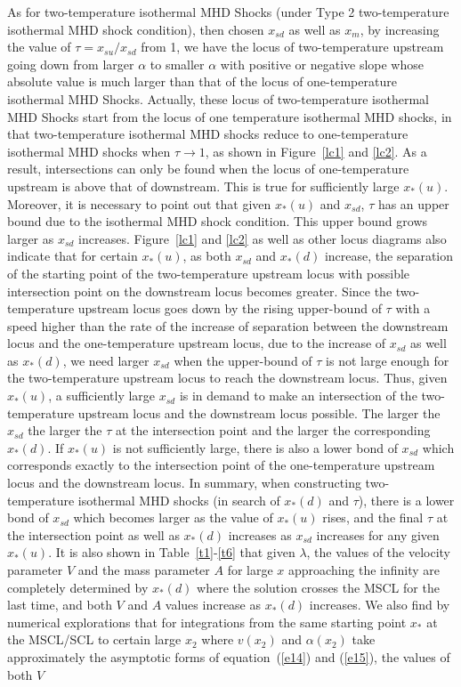 \documentclass[fleqn,usenatbib]{mnras}
\begin{document}
As for two-temperature isothermal MHD Shocks (under Type 2 two-temperature isothermal MHD shock condition), then chosen $x_{sd}$ as well as $x_{m}$, by increasing the value of $\tau=x_{su}/x_{sd}$ from 1, we have the locus of two-temperature upstream going down from larger $\alpha$ to smaller $\alpha$ with positive or negative slope whose absolute value is much larger than that of the locus of one-temperature isothermal MHD Shocks. Actually, these locus of two-temperature isothermal MHD Shocks start from the locus of one temperature isothermal MHD shocks, in that two-temperature isothermal MHD shocks reduce to one-temperature isothermal MHD shocks when $\tau\rightarrow 1$, as shown in Figure~\ref{lc1} and \ref{lc2}. As a result, intersections can only be found when the locus of one-temperature upstream is above that of downstream. This is true for sufficiently large $x_{*}(u)$. Moreover, it is necessary to point out that given $x_{*}(u)$ and $x_{sd}$, $\tau$ has an upper bound due to the isothermal MHD shock condition. This upper bound grows larger as $x_{sd}$ increases. Figure~\ref{lc1} and \ref{lc2} as well as other locus diagrams also indicate that for certain $x_{*}(u)$, as both $x_{sd}$ and $x_{*}(d)$ increase, the separation of the starting point of the two-temperature upstream locus with possible intersection point on the downstream locus becomes greater. Since the two-temperature upstream locus goes down by the rising upper-bound of $\tau$ with a speed higher than the rate of the increase of separation between the downstream locus and the one-temperature upstream locus, due to the increase of $x_{sd}$ as well as $x_{*}(d)$, we need larger $x_{sd}$ when the upper-bound of $\tau$ is not large enough for the two-temperature upstream locus to reach the downstream locus. Thus, given $x_{*}(u)$, a sufficiently large $x_{sd}$ is in demand to make an intersection of the two-temperature upstream locus and the downstream locus possible. The larger the $x_{sd}$ the larger the $\tau$ at the intersection point and the larger the corresponding $x_{*}(d)$. If $x_{*}(u)$ is not sufficiently large, there is also a lower bond of $x_{sd}$ which corresponds exactly to the intersection point of the one-temperature upstream locus and the downstream locus. In summary, when constructing two-temperature isothermal MHD shocks (in search of $x_{*}(d)$ and $\tau$), there is a lower bond of $x_{sd}$ which becomes larger as the value of $x_{*}(u)$ rises, and the final $\tau$ at the intersection point as well as $x_{*}(d)$ increases as $x_{sd}$ increases for any given $x_{*}(u)$. It is also shown in Table~\ref{t1}-\ref{t6} that given $\lambda$, the values of the velocity parameter $V$ and the mass parameter $A$ for large $x$ approaching the infinity are completely determined by $x_{*}(d)$ where the solution crosses the MSCL for the last time, and both $V$ and $A$ values increase as $x_{*}(d)$ increases. We also find by numerical explorations that for integrations from the same starting point $x_{*}$ at the MSCL/SCL to certain large $x_{2}$ where $v(x_{2})$ and $\alpha(x_{2})$ take approximately the asymptotic forms of equation~(\ref{e14}) and (\ref{e15}), the values of both $V$ 
\end{document}
